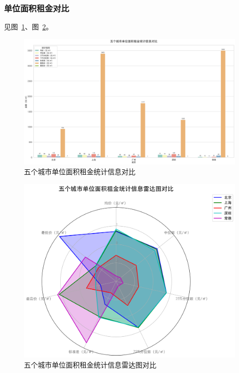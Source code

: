 \subsubsection{单位面积租金对比}
见图~\ref{fig:unit_price_bar_chart}、图~\ref{fig:unit_price_radar_chart}。
\begin{figure}[htbp]
    \centering
    \includegraphics[width=0.7\linewidth]{../../figure/unit_price_bar_chart.png}
    \caption{五个城市单位面积租金统计信息对比}
    \label{fig:unit_price_bar_chart}
\end{figure}
\begin{figure}[htbp]
    \centering
    \includegraphics[width=0.7\linewidth]{../../figure/unit_price_radar_chart.png}
    \caption{五个城市单位面积租金统计信息雷达图对比}
    \label{fig:unit_price_radar_chart}
\end{figure}

